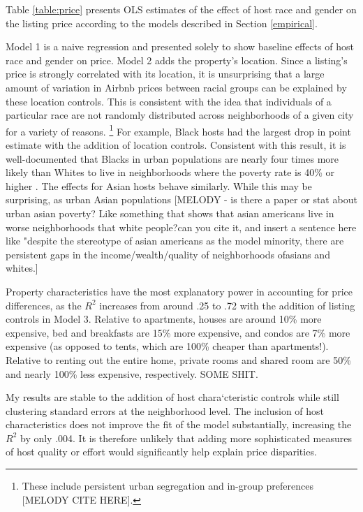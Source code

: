 \label{result1}
	

Table \ref{table:price} presents OLS estimates of the effect of host race and gender on the listing price according to the models described in Section \ref{empirical}. 

Model 1 is a naive regression and presented solely to show baseline effects of host race and gender on price. Model 2 adds the property's location. Since a listing's price is strongly correlated with its location, it is unsurprising that a large amount of variation in Airbnb prices between racial groups can be explained by these location controls. This is consistent with the idea that individuals of a particular race are not randomly distributed across neighborhoods of a given city for a variety of reasons.%
	\footnote{These include persistent urban segregation and in-group preferences [MELODY CITE HERE].}
For example, Black hosts had the largest drop in point estimate with the addition of location controls. Consistent with this result, it is well-documented that Blacks in urban populations are nearly four times more likely than Whites to live in neighborhoods where the poverty rate is 40\% or higher \citep{firebaugh}. The effects for Asian hosts behave similarly. While this may be surprising, as urban Asian populations [MELODY - is there a paper or stat about urban asian poverty? Like something that shows that asian americans live in worse neighborhoods that white people?can you cite  it, and insert a sentence here  like "despite the stereotype of asian americans as the model  minority, there are persistent gaps in the income/wealth/quality of neighborhoods ofasians and whites.]

Property characteristics have the most explanatory power in accounting for price differences, as the $R^2$ increases from around .25 to .72 with the addition of listing controls in Model 3. Relative to apartments, houses are around 10\% more expensive, bed and breakfasts are 15\% more expensive, and condos are 7\% more expensive (as opposed to tents, which are 100\% cheaper than apartments!). Relative to renting out the entire home, private rooms and shared room are 50\% and nearly 100\% less expensive, respectively. SOME SHIT. 

My results are stable to the addition of host chara`cteristic controls while still clustering standard errors at the neighborhood level. The inclusion of host characteristics does not improve the fit of the model substantially, increasing the $R^2$ by only .004. It is therefore unlikely that adding more sophisticated measures of host quality or effort would significantly help explain price disparities. 

